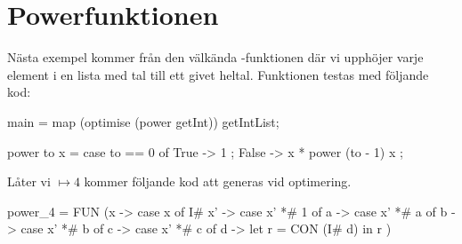 \documentclass[Rapport]{subfiles}
\begin{document}

\section{Powerfunktionen}
Nästa exempel kommer från den välkända -funktionen där vi upphöjer varje element i en lista med tal till ett givet heltal. Funktionen testas med följande kod:
\begin{codeEx}
main = map (optimise (power getInt)) getIntList;

power to x = case to == 0 of
    { True  -> 1
    ; False -> x * power (to - 1) x
    };
\end{codeEx}

Låter vi  $\mapsto 4$ kommer följande kod att generas vid optimering.

\begin{codeEx}
power_4 = FUN (x -> case x of
    { I# x' -> case x' *# 1 of
       { a -> case x' *# a of
          { b -> case x' *# b of
             { c -> case x' *# c of
                { d -> let
                   { r = CON (I# d)
                   } in r
                }
             }
          }
       }
    })
\end{codeEx}
\end{document}
